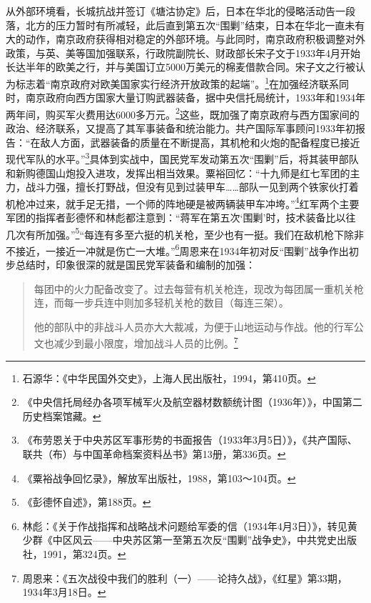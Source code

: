 从外部环境看，长城抗战并签订《塘沽协定》后，日本在华北的侵略活动告一段落，北方的压力暂时有所减轻，此后直到第五次“围剿”结束，日本在华北一直未有大的动作，南京政府获得相对稳定的外部环境。与此同时，南京政府积极调整对外政策，与英、美等国加强联系，行政院副院长、财政部长宋子文于1933年4月开始长达半年的欧美之行，并与美国订立5000万美元的棉麦借款合同。宋子文之行被认为标志着“南京政府对欧美国家实行经济开放政策的起端”。\footnote{石源华：《中华民国外交史》，上海人民出版社，1994，第410页。}在加强经济联系同时，南京政府向西方国家大量订购武器装备，据中央信托局统计，1933年和1934年两年间，购买军火费用达6000多万元。\footnote{《中央信托局经办各项军械军火及航空器材数额统计图（1936年）》，中国第二历史档案馆藏。}这些，既加强了南京政府与西方国家间的政治、经济联系，又提高了其军事装备和统治能力。共产国际军事顾问1933年初报告：“在敌人方面，武器装备的质量在不断提高，其机枪和火炮的配备程度已接近现代军队的水平。”\footnote{《布劳恩关于中央苏区军事形势的书面报告（1933年3月5日）》，《共产国际、联共（布）与中国革命档案资料丛书》第13册，第336页。}具体到实战中，国民党军发动第五次“围剿”后，将其装甲部队和新购德国山炮投入进攻，发挥出相当效果。粟裕回忆：“十九师是红七军团的主力，战斗力强，擅长打野战，但没有见到过装甲车……部队一见到两个铁家伙打着机枪冲过来，就手足无措，一个师的阵地硬是被两辆装甲车冲垮。”\footnote{《粟裕战争回忆录》，解放军出版社，1988，第103～104页。}红军两个主要军团的指挥者彭德怀和林彪都注意到：“蒋军在第五次‘围剿’时，技术装备比以往几次有所加强。”\footnote{《彭德怀自述》，第188页。}“每连有多至六挺的机关枪，至少也有一挺。我们在敌机枪下除非不接近，一接近一冲就是伤亡一大堆。”\footnote{林彪：《关于作战指挥和战略战术问题给军委的信（1934年4月3日）》，转见黄少群《中区风云——中央苏区第一至第五次反“围剿”战争史》，中共党史出版社，1991，第324页。}周恩来在1934年初对反“围剿”战争作出初步总结时，印象很深的就是国民党军装备和编制的加强：

\begin{quote}

每团中的火力配备改变了。过去每营有机关枪连，现改为每团属一重机关枪连，而每一步兵连中则加多轻机关枪的数目（每连三架）。

他的部队中的非战斗人员亦大大裁减，为便于山地运动与作战。他的行军公文也减少到最小限度，增加战斗人员的比例。\footnote{周恩来：《五次战役中我们的胜利（一）——论持久战》，《红星》第33期，1934年3月18日。}
\end{quote}


